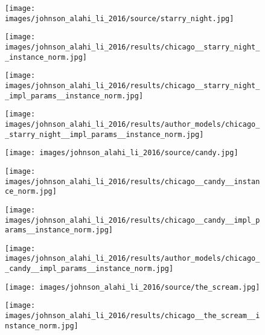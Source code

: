 \begin{figure}[H]
\begin{minipage}[t]{0.24\textwidth}
	\end{minipage}
	\hfill%
	\begin{minipage}[t]{0.24\textwidth}
		\centering
		\texttt{[image: images/johnson\_alahi\_li\_2016/source/starry\_night.jpg]}
	\end{minipage}
	\hfill%
	\begin{minipage}[t]{0.24\textwidth}
		\centering
		\texttt{[image: images/johnson\_alahi\_li\_2016/results/chicago\_\_starry\_night\_\_instance\_norm.jpg]}
	\end{minipage}
	\hfill%
	\begin{minipage}[t]{0.24\textwidth}
		\centering
		\texttt{[image: images/johnson\_alahi\_li\_2016/results/chicago\_\_starry\_night\_\_impl\_params\_\_instance\_norm.jpg]}
	\end{minipage}
	\hfill%
	\begin{minipage}[t]{0.24\textwidth}
		\centering
		\texttt{[image: images/johnson\_alahi\_li\_2016/results/author\_models/chicago\_\_starry\_night\_\_impl\_params\_\_instance\_norm.jpg]}
	\end{minipage}
    \hfill%
	\begin{minipage}[t]{0.24\textwidth}
		\centering
		\texttt{[image: images/johnson\_alahi\_li\_2016/source/candy.jpg]}
	\end{minipage}
	\hfill%
	\begin{minipage}[t]{0.24\textwidth}
		\centering
		\texttt{[image: images/johnson\_alahi\_li\_2016/results/chicago\_\_candy\_\_instance\_norm.jpg]}
	\end{minipage}
	\hfill%
	\begin{minipage}[t]{0.24\textwidth}
		\centering
		\texttt{[image: images/johnson\_alahi\_li\_2016/results/chicago\_\_candy\_\_impl\_params\_\_instance\_norm.jpg]}
	\end{minipage}
	\hfill%
	\begin{minipage}[t]{0.24\textwidth}
		\centering
		\texttt{[image: images/johnson\_alahi\_li\_2016/results/author\_models/chicago\_\_candy\_\_impl\_params\_\_instance\_norm.jpg]}
	\end{minipage}
	\hfill%
	\begin{minipage}[t]{0.24\textwidth}
		\centering
		\texttt{[image: images/johnson\_alahi\_li\_2016/source/the\_scream.jpg]}
	\end{minipage}
	\hfill%
	\begin{minipage}[t]{0.24\textwidth}
		\centering
		\texttt{[image: images/johnson\_alahi\_li\_2016/results/chicago\_\_the\_scream\_\_instance\_norm.jpg]}

\end{minipage}
\end{figure}
